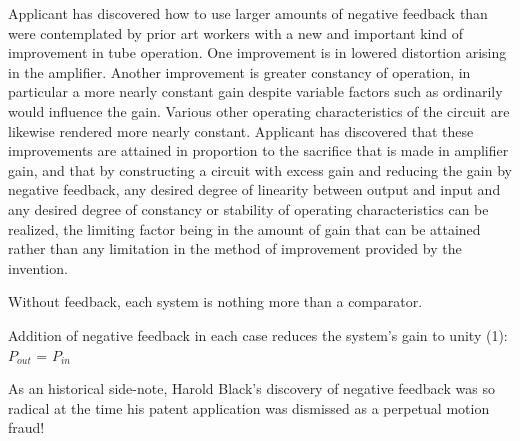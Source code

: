 \vskip 10pt {\narrower \noindent \baselineskip5pt

Applicant has discovered how to use larger amounts of negative feedback than were contemplated by prior art workers with a new and important kind of improvement in tube operation.  One improvement is in lowered distortion arising in the amplifier.  Another improvement is greater constancy of operation, in particular a more nearly constant gain despite variable factors such as ordinarily would influence the gain.  Various other operating characteristics of the circuit are likewise rendered more nearly constant.  Applicant has discovered that these improvements are attained in proportion to the sacrifice that is made in amplifier gain, and that by constructing a circuit with excess gain and reducing the gain by negative feedback, any desired degree of linearity between output and input and any desired degree of constancy or stability of operating characteristics can be realized, the limiting factor being in the amount of gain that can be attained rather than any limitation in the method of improvement provided by the invention.

\par} \vskip 10pt







Without feedback, each system is nothing more than a comparator.

\vskip 10pt

Addition of negative feedback in each case reduces the system's gain to unity (1): $P_{out}$ = $P_{in}$

\vskip 10pt

As an historical side-note, Harold Black's discovery of negative feedback was so radical at the time his patent application was dismissed as a perpetual motion fraud!




